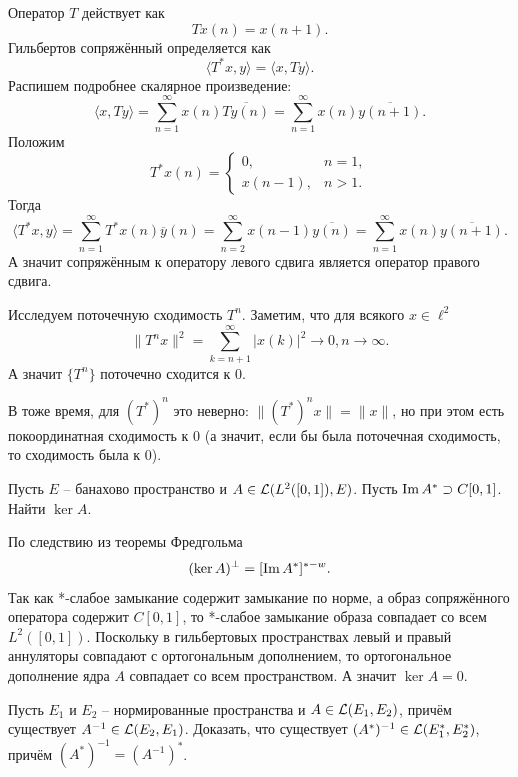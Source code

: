 \begin{solution}
    Оператор $T$ действует как
    \[
        Tx(n) = x(n + 1).
    \]
    Гильбертов сопряжённый определяется как
    \[
        \langle T^* x, y \rangle = \langle x, Ty \rangle.
    \]
    Распишем подробнее скалярное произведение:
    \[
        \langle x, Ty \rangle = \sum_{n = 1}^{\infty} x(n) \overline{Ty(n)} = \sum_{n = 1}^{\infty} x(n) \overline{y(n + 1)}.
    \]
    Положим
    \[
        T^* x(n) = \begin{cases}
                       0, & n = 1, \\
                       x(n - 1), & n > 1.
        \end{cases}
    \]
    Тогда
    \[
        \langle T^* x, y \rangle = \sum_{n = 1}^{\infty} T^*x(n) \overline{y}(n) = \sum_{n = 2}^{\infty} x(n - 1)\overline{y(n)} = \sum_{n = 1}^{\infty} x(n)\overline{y(n + 1)}.
    \]
    А значит сопряжённым к оператору левого сдвига является оператор правого сдвига.

    Исследуем поточечную сходимость $T^n$.
    Заметим, что для всякого $x \in \ell^2$
    \[
        \|T^n x\|^2 = \sum_{k = n + 1}^{\infty} |x(k)|^2 \rightarrow 0, n \rightarrow \infty.
    \]
    А значит $\{T^n\}$ поточечно сходится к $0$.

    В тоже время, для $(T^*)^n$ это неверно: $\|(T^*)^n x\| = \|x\|$, но при этом есть покоординатная сходимость к $0$ (а значит, если бы была поточечная сходимость, то сходимость была к 0).
\end{solution}
\begin{task}[11.10]
    Пусть $E$ -- банахово пространство и $A \in \mathcal{L}(L^2([0, 1]), E)$.
    Пусть $\operatorname{Im} A^* \supset C[0, 1]$.
    Найти $\ker A$.
\end{task}
\begin{solution}
    По следствию из теоремы Фредгольма
    \[
        (\ker A)^{\perp} = [\operatorname{Im} A^*]^{*-w}.
    \]
    Так как *-слабое замыкание содержит замыкание по норме, а образ сопряжённого оператора содержит $C[0, 1]$, то *-слабое замыкание образа совпадает со всем $L^2([0, 1])$.
    Поскольку в гильбертовых пространствах левый и правый аннуляторы совпадают с ортогональным дополнением, то ортогональное дополнение ядра $A$ совпадает со всем пространством.
    А значит $\ker A = 0$.
\end{solution}
\begin{task}[11.12]
    Пусть $E_1$ и $E_2$ -- нормированные пространства и $A \in \mathcal{L}(E_1, E_2)$, причём существует $A^{-1} \in \mathcal{L}(E_2, E_1)$.
    Доказать, что существует $(A^*)^{-1} \in \mathcal{L}(E_1^*, E_2^*)$, причём $(A^*)^{-1} = (A^{-1})^*$.
\end{task}
